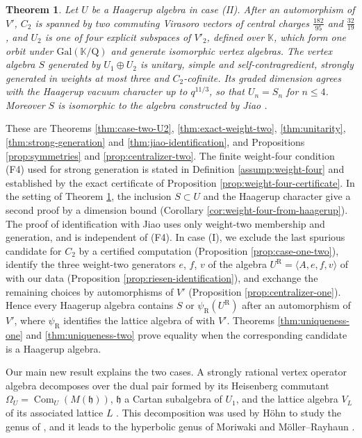 \documentclass[leqno]{article}
\newcommand{\K}{\ensuremath{\mathbb{K}}}
\newcommand{\Q}{\mathrm{Q}}
\newcommand{\la}{\langle}
\newcommand{\ra}{\rangle}
\renewcommand{\leq}{\ensuremath{\leqslant}}
\newtheorem{thm}{Theorem}[section]
\numberwithin{equation}{section}
\begin{document}
\begin{thm}
\label{thm:intro-case-two}
Let $U$ be a Haagerup algebra in case (II). After an automorphism of $V'$, $C_2$ is spanned by two commuting Virasoro vectors of central charges $\frac{182}{95}$ and $\frac{32}{19}$, and $U_2$ is one of four explicit subspaces of $V'_2$, defined over $\K$, which form one orbit under $\mathrm{Gal}(\K/\Q)$ and generate isomorphic vertex algebras. The vertex algebra $S$ generated by $U_1 \oplus U_2$ is unitary, simple and self-contragredient, strongly generated in weights at most three and $C_2$-cofinite. Its graded dimension agrees with the Haagerup vacuum character up to $q^{11/3}$, so that $U_n = S_n$ for $n \leq 4$. Moreover $S$ is isomorphic to the algebra constructed by Jiao \cite{Jia26}.
\end{thm}

These are Theorems \ref{thm:case-two-U2}, \ref{thm:exact-weight-two}, \ref{thm:unitarity}, \ref{thm:strong-generation} and \ref{thm:jiao-identification}, and Propositions \ref{prop:symmetries} and \ref{prop:centralizer-two}. The finite weight-four condition \textup{(F4)} used for strong generation is stated in Definition \ref{assump:weight-four} and established by the exact certificate of Proposition \ref{prop:weight-four-certificate}. In the setting of Theorem \ref{thm:intro-case-two}, the inclusion $S \subset U$ and the Haagerup character give a second proof by a dimension bound (Corollary \ref{cor:weight-four-from-haagerup}). The proof of identification with Jiao uses only weight-two membership and generation, and is independent of \textup{(F4)}. In case (I), we exclude the last spurious candidate for $C_2$ by a certified computation (Proposition \ref{prop:case-one-two}), identify the three weight-two generators $e$, $f$, $v$ of the algebra $U^{\mathrm R} = \la A,e,f,v\ra$ of \cite{Rie26} with our data (Proposition \ref{prop:riesen-identification}), and exchange the remaining choices by automorphisms of $V'$ (Proposition \ref{prop:centralizer-one}). Hence every Haagerup algebra contains $S$ or $\psi_{\mathrm R}(U^{\mathrm R})$ after an automorphism of $V'$, where $\psi_{\mathrm R}$ identifies the lattice algebra of \cite{Rie26} with $V'$. Theorems \ref{thm:uniqueness-one} and \ref{thm:uniqueness-two} prove equality when the corresponding candidate is a Haagerup algebra.

Our main new result explains the two cases. A strongly rational vertex operator algebra decomposes over the dual pair formed by its Heisenberg commutant $\Omega_U = \operatorname{Com}_U(M(\mathfrak h))$, $\mathfrak h$ a Cartan subalgebra of $U_1$, and the lattice algebra $V_L$ of its associated lattice $L$ \cite{Mas14,MoR24a}. This decomposition was used by Höhn \cite{Hoh17} to study the genus of \cite{Hoh03}, and it leads to the hyperbolic genus of Moriwaki \cite{Mor21} and Möller--Rayhaun \cite{MoR24a}.
\end{document}
